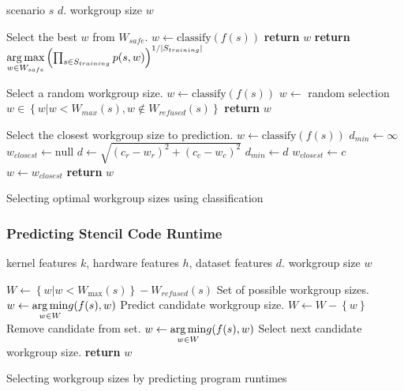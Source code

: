\documentclass[nonatbib,preprint,9pt]{sigplanconf}
\begin{document}
\begin{algorithm}
\begin{algorithmic}[1]
\Require scenario $s$
$d$.
\Ensure workgroup size $w$

\Comment Select the best $w$ from $W_{safe}$.
\State $w \leftarrow \text{classify}(f(s))$
    \State \textbf{return} $w$
\Else
  \State \textbf{return} $\underset{w \in W_{safe}}{\operatorname*{arg\,max}}
\left(
  \prod_{s \in S_{training}} p(s, w)
\right)^{1/|S_{training}|}$
\EndIf
\EndProcedure
\item[] %

\Comment Select a random workgroup size.
\State $w \leftarrow \text{classify}(f(s))$
  \State $w \leftarrow $ random selection $w \in \left\{ w | w < W_{max}(s), w \not\in W_{refused}(s) \right\}$
\EndWhile
\State \textbf{return} $w$
\EndProcedure
\item[] %

\Comment Select the closest workgroup size to prediction.
\State $w \leftarrow \text{classify}(f(s))$
  \State $d_{min} \leftarrow \infty$
  \State $w_{closest} \leftarrow \text{null}$
    \State $d \leftarrow \sqrt{\left(c_r - w_r\right)^2 + \left(c_c - w_c\right)^2}$
      \State $d_{min} \leftarrow d$
      \State $w_{closest} \leftarrow c$
    \EndIf
  \EndFor
  \State $w \leftarrow w_{closest}$
\EndWhile
\State \textbf{return} $w$
\EndProcedure
\end{algorithmic}
\caption{Selecting optimal workgroup sizes using classification}
\label{alg:autotune-classification}
\end{algorithm}

\subsubsection{Predicting Stencil Code Runtime}

\begin{algorithm}
\begin{algorithmic}[1]
\Require kernel features $k$, hardware features $h$, dataset features
$d$.
\Ensure workgroup size $w$

\State $W \leftarrow \left\{ w | w < W_{\max}(s) \right\} - W_{refused}(s)$
\Comment Set of possible workgroup sizes.
\State $w \leftarrow \underset{w \in W}{\operatorname*{arg\,min}} g(f(s), w)$
\Comment Predict candidate workgroup size.
  \State $W \leftarrow W - \left\{ w \right\}$
  \Comment Remove candidate from set.
  \State $w \leftarrow \underset{w \in W}{\operatorname*{arg\,min}} g(f(s), w)$
  \Comment Select next candidate workgroup size.
\EndWhile
\State \textbf{return} $w$
\end{algorithmic}
\caption{Selecting workgroup sizes by predicting program runtimes}
\label{alg:autotune-runtime-regression}
\end{algorithm}
\end{document}
